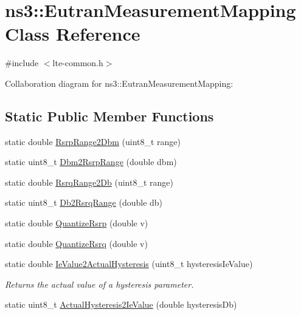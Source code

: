 \hypertarget{classns3_1_1EutranMeasurementMapping}{}\section{ns3\+:\+:Eutran\+Measurement\+Mapping Class Reference}
\label{classns3_1_1EutranMeasurementMapping}


{\ttfamily \#include $<$lte-\/common.\+h$>$}



Collaboration diagram for ns3\+:\+:Eutran\+Measurement\+Mapping\+:
\subsection*{Static Public Member Functions}
\begin{DoxyCompactItemize}
\item 
static double \hyperlink{classns3_1_1EutranMeasurementMapping_a695a24d417b914a41b05a450cc1e1f9e}{Rsrp\+Range2\+Dbm} (uint8\+\_\+t range)
\item 
static uint8\+\_\+t \hyperlink{classns3_1_1EutranMeasurementMapping_a2c42e6628a24280f58edf8f3814b9d54}{Dbm2\+Rsrp\+Range} (double dbm)
\item 
static double \hyperlink{classns3_1_1EutranMeasurementMapping_a8c1e02fbc1226718eb0914cf13362147}{Rsrq\+Range2\+Db} (uint8\+\_\+t range)
\item 
static uint8\+\_\+t \hyperlink{classns3_1_1EutranMeasurementMapping_adcd875f25361c17646c45695b9b6e8c4}{Db2\+Rsrq\+Range} (double db)
\item 
static double \hyperlink{classns3_1_1EutranMeasurementMapping_a10d8750ed4f5b0f80feaa4caca6df6da}{Quantize\+Rsrp} (double v)
\item 
static double \hyperlink{classns3_1_1EutranMeasurementMapping_a8dbe8c7ce610e6792bd54db9bc5bb501}{Quantize\+Rsrq} (double v)
\item 
static double \hyperlink{classns3_1_1EutranMeasurementMapping_ac0c6d0adbba21c8531600fed399f9f21}{Ie\+Value2\+Actual\+Hysteresis} (uint8\+\_\+t hysteresis\+Ie\+Value)
\begin{DoxyCompactList}\small\item\em Returns the actual value of a hysteresis parameter. \end{DoxyCompactList}\item 
static uint8\+\_\+t \hyperlink{classns3_1_1EutranMeasurementMapping_a38be54b75b2d4e08fd212310cb668881}{Actual\+Hysteresis2\+Ie\+Value} (double hysteresis\+Db)

\end{DoxyCompactItemize}
